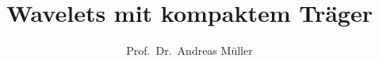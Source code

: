 %
%
%
\usepackage[utf8]{inputenc}
\usepackage[T1]{fontenc}
\usepackage{epic}
\usepackage{color}
\usepackage{array}
\usepackage{ifthen}
\usepackage{amsmath}
\usepackage{lmodern}
\usepackage{tikz}
\usetikzlibrary{shapes.geometric}
\beamertemplatenavigationsymbolsempty
\title[Daubechies]{Wavelets mit kompaktem Träger}
\author[A.~Müller]{Prof.~Dr.~Andreas Müller}
\date[]{}

